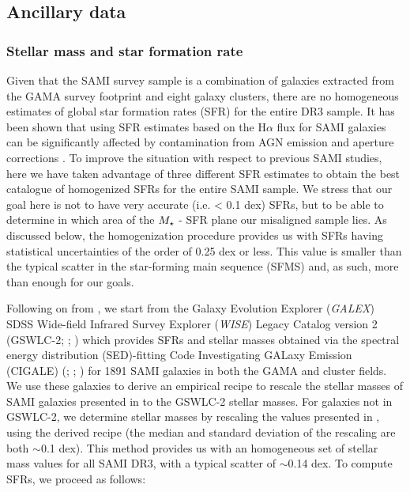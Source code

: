 \documentclass[fleqn,usenatbib]{mnras}
\begin{document}
\subsection{Ancillary data}
\label{sec:ancillary_data} 

\subsubsection{Stellar mass and star formation rate}
\label{sec:Ms_SFR}

Given that the SAMI survey sample is a combination of galaxies extracted from the GAMA survey footprint and eight galaxy clusters, there are no homogeneous estimates of global star formation rates (SFR) for the entire DR3 sample. It has been shown that using SFR estimates based on the H$\alpha$ flux for SAMI galaxies can be significantly affected by contamination from AGN emission and aperture corrections \citep{Medling2018}.
To improve the situation with respect to previous SAMI studies, here we have taken advantage of three different SFR estimates to obtain the best catalogue of homogenized SFRs for the entire SAMI sample. We stress that our goal here is not to have very accurate (i.e. < 0.1 dex) SFRs, but to be able to determine in which area of the $M_{\rm{\star}}$ - SFR plane our misaligned sample lies. As discussed below, the homogenization procedure provides us with SFRs having statistical uncertainties of the order of 0.25 dex or less. This value is smaller than the typical scatter in the star-forming main sequence (SFMS) and, as such, more than enough for our goals.  
 
Following on from \cite{FM2021}, we start from the Galaxy Evolution Explorer (\textit{GALEX}) SDSS Wide-field Infrared Survey Explorer (\textit{WISE}) Legacy Catalog version 2 (GSWLC-2; \citealt{Salim2016}; \citealt*{Salim2018}) which provides SFRs and stellar masses obtained via the spectral energy distribution (SED)-fitting Code Investigating GALaxy Emission (CIGALE) (\citealt*{Burgarella2005}; \citealt{Noll2009}; \citealt{Boquien2019}) for 1891 SAMI galaxies in both the GAMA and cluster fields. We use these galaxies to derive an empirical recipe to rescale the stellar masses of SAMI galaxies presented in \cite{Bryant2015} to the GSWLC-2 stellar masses. For galaxies not in GSWLC-2, we determine stellar masses by rescaling the values presented in \cite{Bryant2015}, using the derived recipe (the median and standard deviation of the rescaling are both $\sim$0.1 dex). This method provides us with an homogeneous set of stellar mass values for all SAMI DR3, with a typical scatter of $\sim$0.14 dex. To compute SFRs, we proceed as follows:
\end{document}
